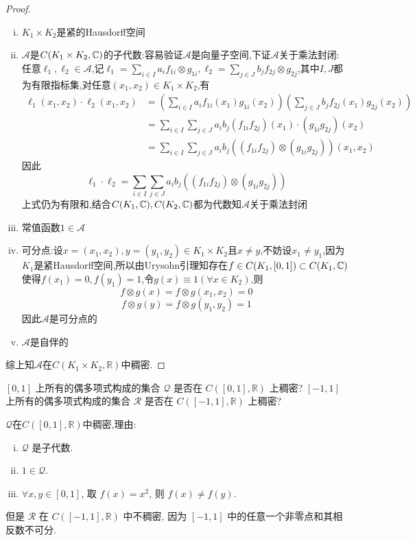 \begin{proof}
    \begin{enumerate}[(i)]
    \item $K_1\times K_2$是紧的Hausdorff空间
    \item $\mathcal{A}$是$C(K_1\times K_2,\mathbb{C})$的子代数:容易验证$\mathcal{A}$是向量子空间,下证$\mathcal{A}$关于乘法封闭:\\
    任意$\ell_1,\ell_2\in\mathcal{A}$,记$\ell_1=\sum_{i\in I}a_if_{1i}\otimes g_{1i},\ell_2=\sum_{j\in J}b_jf_{2j}\otimes g_{2j}$,其中$I,J$都为有限指标集,对任意$(x_1,x_2)\in K_1\times K_2$,有\[\begin{split}\ell_1(x_1,x_2)\cdot\ell_2(x_1,x_2)&=\left(\sum_{i\in I}a_if_{1i}(x_1)g_{1i}(x_2)\right)\left(\sum_{j\in J}b_jf_{2j}(x_1)g_{2j}(x_2)\right)\\&=\sum_{i\in I}\sum_{j\in J}a_ib_j(f_{1i}f_{2j})(x_1)\cdot(g_{1i}g_{2j})(x_2)\\&=\sum_{i\in I}\sum_{j\in J}a_ib_j\left((f_{1i}f_{2j})\otimes(g_{1i}g_{2j})\right)(x_1,x_2)\end{split}\]
    因此\[\ell_1\cdot\ell_2=\sum_{i\in I}\sum_{j\in J}a_ib_j\left((f_{1i}f_{2j})\otimes(g_{1i}g_{2j})\right)\]
    上式仍为有限和,结合$C(K_1,\mathbb{C}),C(K_2,\mathbb{C})$都为代数知$\mathcal{A}$关于乘法封闭
    \item 常值函数$1\in\mathcal{A}$
    \item 可分点:设$x=(x_1,x_2),y=(y_1,y_2)\in K_1\times K_2$且$x\neq y$,不妨设$x_1\neq y_1$,因为$K_1$是紧Hausdorff空间,所以由Urysohn引理知存在$f\in C(K_1,[0,1])\subset C(K_1,\mathbb{C})$使得$f(x_1)=0,f(y_1)=1$,令$g(x)\equiv1(\forall x\in K_2)$,则
    \[f\otimes g(x)=f\otimes g(x_1,x_2)=0\]
    \[f\otimes g(y)=f\otimes g(y_1,y_2)=1\]
    因此$\mathcal{A}$是可分点的
    \item $\mathcal{A}$是自伴的
    \end{enumerate}
    综上知$\mathcal{A}$在$C(K_1\times K_2,\mathbb{R})$中稠密.
\end{proof}



\begin{exercise}
    $[0,1]$ 上所有的偶多项式构成的集合 $\mathcal{Q}$ 是否在 $C([0,1], \mathbb{R})$ 上稠密?
    $[-1,1]$ 上所有的偶多项式构成的集合 $\mathcal{R}$ 是否在 $C([-1,1], \mathbb{R})$ 上稠密?
\end{exercise}

\begin{solution}
    $\mathcal{Q}$在$C([0,1],\mathbb{R})$中稠密,理由:
    \begin{enumerate}[(i)]
    \item $\mathcal{Q}$ 是子代数.
    \item $1\in\mathcal{Q}$.
    \item $\forall x,y\in [0,1]$, 取 $f(x)=x^2$, 则 $f(x)\neq f(y)$.
    \end{enumerate}
    但是 $\mathcal{R}$ 在 $C([-1,1],\mathbb{R})$ 中不稠密, 因为 $[-1,1]$ 中的任意一个非零点和其相反数不可分.
\end{solution}



